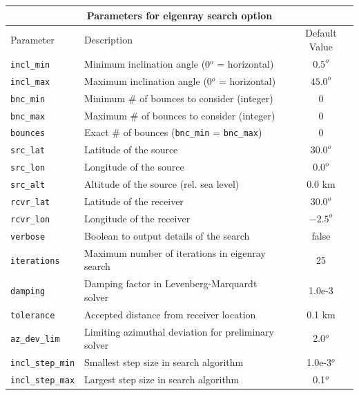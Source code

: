 \documentclass[10pt]{article}
\begin{document}
 \begin{tabular}{ | l | l | c | }
   \hline
   \multicolumn{3}{|c|}{\textbf{Parameters for eigenray search option}} \\
   \hline
   Parameter & Description & Default Value \\
   \hline \hline
  \verb=incl_min= 		& Minimum inclination angle (0\(^o\) = horizontal)			& \(0.5^o\)	\\
  \verb=incl_max= 		& Maximum inclination angle (0\(^o\) = horizontal)			& \(45.0^o\) \\ \hline
 \verb=bnc_min=		& Minimum \# of bounces to consider (integer)				& 0 \\ 
 \verb=bnc_max=		& Maximum \# of bounces to consider (integer) 				& 0 \\ 
 \verb=bounces=		& Exact \# of bounces (\verb=bnc_min= = \verb=bnc_max=)	& 0 \\ \hline
 \verb=src_lat= 			& Latitude of the source 								& \(30.0^o\) \\
 \verb=src_lon= 		& Longitude of the source								& \(0.0^o\) \\
 \verb=src_alt=  		& Altitude of the source (rel. sea level)					& \(0.0\) km \\ \hline
  \verb=rcvr_lat= 		& Latitude of the receiver								& \(30.0^o\)	\\
  \verb=rcvr_lon= 		& Longitude of the receiver							& \(-2.5^o\) \\ \hline
 \verb=verbose=		& Boolean to output details of the search					& false \\
 \verb=iterations=		& Maximum number of iterations in eigenray search			& 25 \\ 
 \verb=damping=		& Damping factor in Levenberg-Marquardt solver			& 1.0e-3 \\
 \verb=tolerance=		& Accepted distance from receiver location				& 0.1 km \\
 \verb=az_dev_lim=		& Limiting azimuthal deviation for preliminary solver			& 2.0\(^o\) \\
 \verb=incl_step_min=	& Smallest step size in search algorithm					& 1.0e-3\(^o\)\\
 \verb=incl_step_max=	& Largest step size in search algorithm					& 0.1\(^o\) \\ \hline
\end{tabular}

 \vspace{0.01\textheight}
\end{document}
